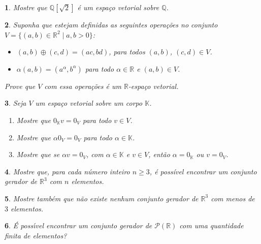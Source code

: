 \documentclass[12pt]{exam}
\newtheorem{exercicio}{}
\newcommand{\rac}{\mathbb{Q}}
\newcommand{\real}{\mathbb{R}}
\newcommand{\cp}[1]{\mathbb{#1}}
\begin{document}
\begin{exercicio}
  Mostre que $\rac[\sqrt{2}]$ \'e um espa\c{c}o vetorial sobre $\rac$.
\end{exercicio}

\begin{exercicio}
  Suponha que estejam definidas as seguintes opera\c{c}\~oes no conjunto $V = \{(a, b) \in \real^2 \mid a, b > 0\}$:
  \begin{itemize}
    \item $(a, b) \oplus (c, d) = (ac, bd)$, para todos $(a,b)$, $(c,d) \in V$.
    \item $\alpha (a, b) = (a^\alpha, b^\alpha)$ para todo $\alpha \in \real$ e $(a, b) \in V$.
  \end{itemize}
  Prove que $V$ com essa opera\c{c}\~oes \'e um $\real$-espa\c{c}o vetorial.
\end{exercicio}

\begin{exercicio}
  Seja $V$ um espa\c{c}o vetorial sobre um corpo $\cp{K}$.
  \begin{enumerate}[label={\alph*})]
    \item Mostre que $0_\cp{K} v = 0_V$ para todo $v \in V$.
    \item Mostre que $\alpha 0_V = 0_V$ para todo $\alpha \in \cp{K}$.
    \item Mostre que se $\alpha v = 0_V$, com $\alpha \in \cp{K}$ e $v \in V$, ent\~ao $\alpha = 0_\cp{K}$ ou $v = 0_V$.
  \end{enumerate}
\end{exercicio}

\begin{exercicio}
  Mostre que, para cada número inteiro $n \ge 3$, é possível encontrar um conjunto gerador de $\real^3$ com $n$ elementos.
\end{exercicio}

\begin{exercicio}
  Mostre também que não existe nenhum conjunto gerador de $\real^3$ com menos de $3$ elementos.
\end{exercicio}

\begin{exercicio}
  \'E poss{\'\i}vel encontrar um conjunto gerador de $\mathcal{P}(\real)$ com uma quantidade finita de elementos?
\end{exercicio}
\end{document}
